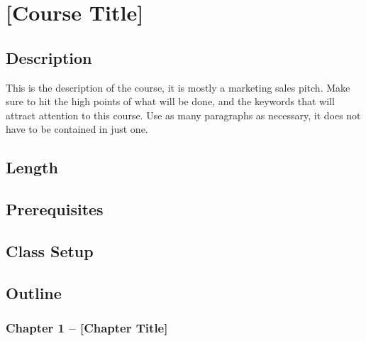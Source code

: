 \documentclass[11pt, twoside, openright]{book}
\begin{document}
\chapter*{[Course Title]}

\section*{Description}

\par{
	This is the description of the course, it is mostly a marketing sales pitch.
	Make sure to hit the high points of what will be done, and the keywords that will attract attention to this course.
	Use as many paragraphs as necessary, it does not have to be contained in just one.
}

\section*{Length}


\section*{Prerequisites}


\section*{Class Setup}


\section*{Outline}

\subsection*{Chapter 1 – [Chapter Title]}
\end{document}
